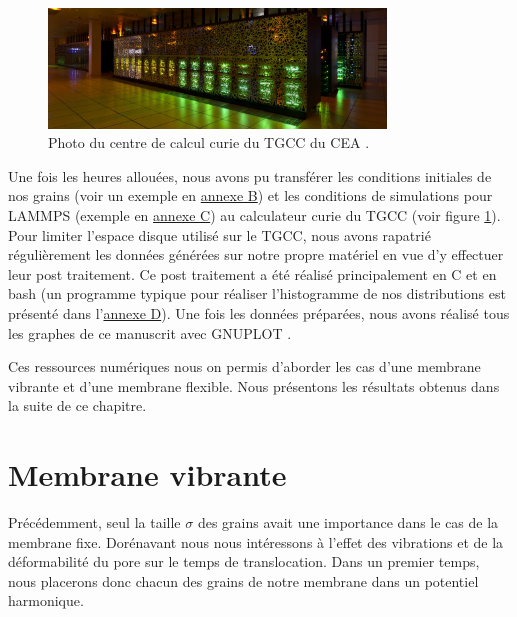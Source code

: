 \begin{figure}[H]
\begin{center}
\includegraphics[width=0.8\textwidth]{Curie-M2012_011_Vue_002.jpg}

\caption[TGCC du CEA]{Photo du centre de calcul curie du TGCC du CEA \cite{tgcc}.}
\label{tgcc}
\end{center}
\end{figure}


Une fois les heures allouées, nous avons pu transférer les conditions initiales de nos grains (voir un exemple en \hyperref[annexeb]{annexe B}) et les conditions de simulations pour LAMMPS (exemple en \hyperref[annexec]{annexe C}) au calculateur curie du TGCC (voir figure \ref{tgcc}). Pour limiter l'espace disque utilisé sur le TGCC, nous avons rapatrié régulièrement les données générées sur notre propre matériel en vue d'y effectuer leur post traitement. Ce post traitement a été réalisé principalement en C et en bash (un programme typique pour réaliser l'histogramme de nos distributions est présenté dans l'\hyperref[annexed]{annexe D}). Une fois les données préparées, nous avons réalisé tous les graphes de ce manuscrit avec GNUPLOT \cite{gnuplot}.

Ces ressources numériques nous on permis d'aborder les cas d'une membrane vibrante et d'une membrane flexible. Nous présentons les résultats obtenus dans la suite de ce chapitre.



\newpage


\section{Membrane vibrante}
\label{chapitremembvib}

Précédemment, seul la taille $\sigma$ des grains avait une importance dans le cas de la membrane fixe. Dorénavant nous nous intéressons à l'effet des vibrations et de la déformabilité du pore sur le temps de translocation. Dans un premier temps, nous placerons donc chacun des grains de notre membrane dans un potentiel harmonique.\\

